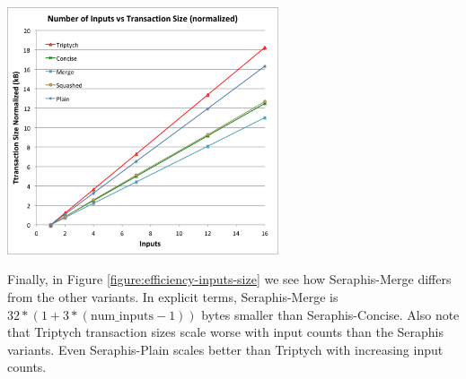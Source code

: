 \begin{center}
    \includegraphics[width=8cm]{figures/inputs_size.png}
    \label{figure:efficiency-inputs-size}
\end{center}

Finally, in Figure \ref{figure:efficiency-inputs-size} we see how Seraphis-Merge differs from the other variants. In explicit terms, Seraphis-Merge is $32*(1 + 3*(\textrm{num\_inputs} - 1))$ bytes smaller than Seraphis-Concise. Also note that Triptych transaction sizes scale worse with input counts than the Seraphis variants. Even Seraphis-Plain scales better than Triptych with increasing input counts.
